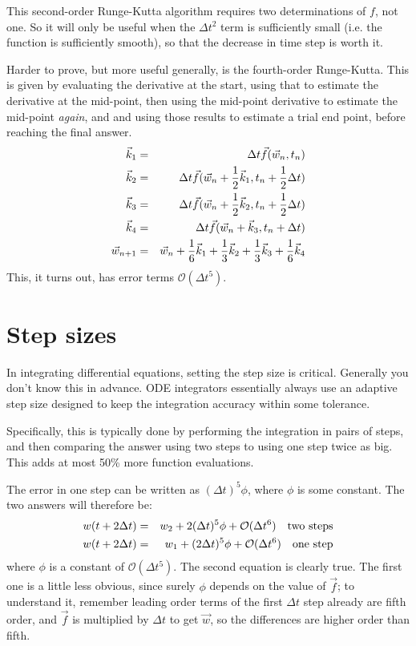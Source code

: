 This second-order Runge-Kutta algorithm requires two determinations of
$f$, not one. So it will only be useful when the $\Delta t^2$ term is
sufficiently small (i.e. the function is sufficiently smooth), so that
the decrease in time step is worth it.  

Harder to prove, but more useful generally, is the fourth-order
Runge-Kutta. This is given by evaluating the derivative at the start,
using that to estimate the derivative at the mid-point, then using the
mid-point derivative to estimate the mid-point {\it again}, and and
using those results to estimate a trial end point, before reaching the
final answer.
\begin{eqnarray}
\vec{k}_1 &=& \Delta t \vec{f}(\vec{w}_n, t_n) \cr
\vec{k}_2 &=& \Delta t \vec{f}(\vec{w}_n + \frac{1}{2} \vec{k}_1, t_n +
\frac{1}{2} \Delta t) \cr
\vec{k}_3 &=& \Delta t \vec{f}(\vec{w}_n + \frac{1}{2} \vec{k}_2, t_n +
\frac{1}{2} \Delta t) \cr
\vec{k}_4 &=& \Delta t \vec{f}(\vec{w}_n + \vec{k}_3, t_n + \Delta t) \cr
\vec{w}_{n+1}  &=& \vec{w}_n + \frac{1}{6} \vec{k}_1
+ \frac{1}{3} \vec{k}_2 + \frac{1}{3} \vec{k}_3 + \frac{1}{6} \vec{k}_4
\end{eqnarray}
This, it turns out, has error terms $\mathcal{O}(\Delta t^5)$. 

\section{Step sizes}

In integrating differential equations, setting the step size is
critical. Generally you don't know this in advance. ODE integrators
essentially always use an adaptive step size designed to keep the
integration accuracy within some tolerance.

Specifically, this is typically done by performing the integration in
pairs of steps, and then comparing the answer using two steps to using
one step twice as big. This adds at most 50\% more function
evaluations.

The error in one step can be written as $(\Delta t)^5 \phi$, where
$\phi$ is some constant.  The two answers will therefore be:
\begin{eqnarray}
w(t+ 2\Delta t) &=& w_2 + 2 (\Delta t)^5 \phi + \mathcal{O}(\Delta
t^6) \quad\mathrm{two~steps} 
\cr
w(t+ 2\Delta t) &=& w_1 + (2\Delta t)^5 \phi + \mathcal{O}(\Delta t^6)
\quad\mathrm{one~step} 
\end{eqnarray}
where $\phi$ is a constant of $\mathcal{O}(\Delta t^5)$. The second
equation is clearly true. The first one is a little less obvious,
since surely $\phi$ depends on the value of $\vec{f}$; to understand
it, remember leading order terms of the first $\Delta t$ step already
are fifth order, and $\vec{f}$ is multiplied by $\Delta t$ to get
$\vec{w}$, so the differences are higher order than fifth. 

